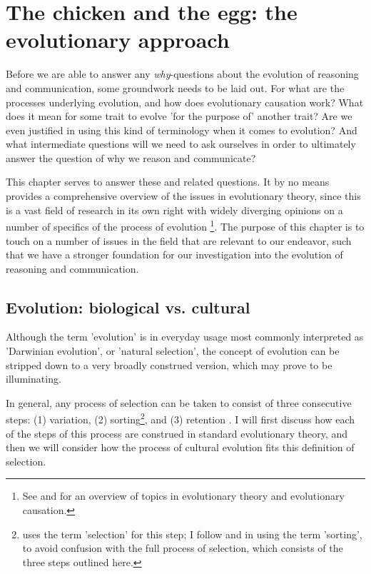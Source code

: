 \chapter{The chicken and the egg: the evolutionary approach}
\label{ch:evolution}

Before we are able to answer any \emph{why}-questions about the evolution of reasoning and communication, some groundwork needs to be laid out. For what are the processes underlying evolution, and how does evolutionary causation work? What does it mean for some trait to evolve 'for the purpose of' another trait? Are we even justified in using this kind of terminology when it comes to evolution? And what intermediate questions will we need to ask ourselves in order to ultimately answer the question of why we reason and communicate?

This chapter serves to answer these and related questions. It by no means provides a comprehensive overview of the issues in evolutionary theory, since this is a vast field of research in its own right with widely diverging opinions on a number of specifics of the process of evolution \footnote{See \citet{Ariew02} and \citet{UllerLaland19} for an overview of topics in evolutionary theory and evolutionary causation.}.
The purpose of this chapter is to touch on a number of issues in the field that are relevant to our endeavor, such that we have a stronger foundation for our investigation into the evolution of reasoning and communication.

\section{Evolution: biological vs. cultural}
\label{sec:evo-bio-culture}

Although the term 'evolution' is in everyday usage most commonly interpreted as 'Darwinian evolution', or 'natural selection', the concept of evolution can be stripped down to a very broadly construed version, which may prove to be illuminating.

In general, any process of selection can be taken to consist of three consecutive steps: (1) variation, (2) sorting\footnote{\citet{Donahoe03} uses the term 'selection' for this step; I follow \citet{Heyes18} and \citet{S-P13} in using the term 'sorting', to avoid confusion with the full process of selection, which consists of the three steps outlined here.}, and (3) retention \citep{Donahoe03}. I will first discuss how each of the steps of this process are construed in standard evolutionary theory, and then we will consider how the process of cultural evolution fits this definition of selection.

